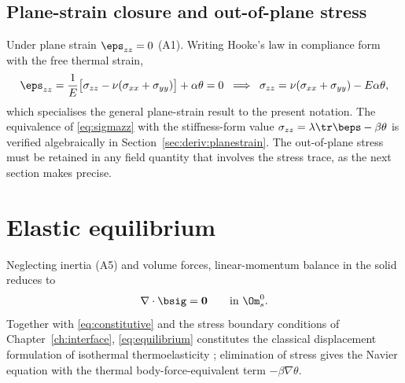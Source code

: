 \subsection{Plane-strain closure and out-of-plane stress}
Under plane strain $\eps_{zz}=0$ (A1). Writing Hooke's law in compliance form with the free thermal
strain,
\begin{equation}
\eps_{zz}=\frac{1}{E}\big[\sigma_{zz}-\nu(\sigma_{xx}+\sigma_{yy})\big]+\alpha\theta=0
\;\;\Longrightarrow\;\;
\sigma_{zz}=\nu(\sigma_{xx}+\sigma_{yy})-E\alpha\theta ,
\label{eq:sigmazz}
\end{equation}
which specialises the general plane-strain result \cite{timoshenko1970elasticity,boley1960theory}
to the present notation. The equivalence of \eqref{eq:sigmazz} with the stiffness-form value
$\sigma_{zz}=\lambda\tr\beps-\beta\theta$ is verified algebraically in
Section~\ref{sec:deriv:planestrain}. The out-of-plane stress must be retained in any field
quantity that involves the stress trace, as the next section makes precise.

\section{Elastic equilibrium}
Neglecting inertia (A5) and volume forces, linear-momentum balance in the solid reduces to
\begin{equation}
\nabla\cdot\bsig=\mathbf{0} \qquad \text{in } \Om_s^0 .
\label{eq:equilibrium}
\end{equation}
Together with \eqref{eq:constitutive} and the stress boundary conditions of
Chapter~\ref{ch:interface}, \eqref{eq:equilibrium} constitutes the classical displacement
formulation of isothermal thermoelasticity \cite{boley1960theory}; elimination of stress gives the
Navier equation with the thermal body-force-equivalent term $-\beta\nabla\theta$.

